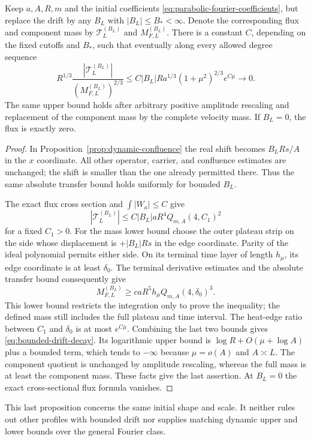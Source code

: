 \begin{proposition}
\label{prop:bounded-drift-shape}
Keep $a,A,R,m$ and the initial coefficients
\eqref{eq:parabolic-fourier-coefficients}, but replace the drift by any
$B_L$ with $|B_L|\le B_*<\infty$.  Denote the corresponding flux and
component mass by $\mathcal T_L^{(B_L)}$ and $M_{F,L}^{(B_L)}$.
There is a constant $C$, depending on the fixed cutoffs and $B_*$,
such that eventually along every allowed degree sequence
\begin{equation}\label{eq:bounded-drift-decay}
 R^{1/3}\frac{|\mathcal T_L^{(B_L)}|}
 {(M_{F,L}^{(B_L)})^{2/3}}
 \le C |B_L|R a^{1/3}(1+\mu^2)^{2/3}e^{C\mu}
 \longrightarrow0.
\end{equation}
The same upper bound holds after arbitrary positive amplitude
rescaling and replacement of the component mass by the complete
velocity mass.  If $B_L=0$, the flux is exactly zero.
\end{proposition}
\begin{proof}
In Proposition~\ref{prop:dynamic-confluence} the real shift becomes
$B_LRs/A$ in the $x$ coordinate.  All other operator, carrier, and
confluence estimates are unchanged; the shift is smaller than the one
already permitted there.  Thus the same absolute transfer bound holds
uniformly for bounded $B_L$.

The exact flux cross section and $\int|W_a|\le C$ give
\[
 |\mathcal T_L^{(B_L)}|
       \le C|B_L|aR^4 Q_{m,A}(4,C_1)^2
\]
for a fixed $C_1>0$.  For the mass lower bound choose the outer
plateau strip on the side whose displacement is $+|B_L|Rs$ in the
edge coordinate.  Parity of the ideal polynomial permits either side.
On its terminal time layer of length $h_\mu$, its edge coordinate is
at least $\delta_0$.  The terminal derivative estimates and the
absolute transfer bound consequently give
\[
 M_{F,L}^{(B_L)}
       \ge caR^5 h_\mu Q_{m,A}(4,\delta_0)^3.
\]
This lower bound restricts the integration only to prove the inequality;
the defined mass still includes the full plateau and time interval.
The heat-edge ratio between $C_1$ and $\delta_0$ is at most $e^{C\mu}$.
Combining the last two bounds gives
\eqref{eq:bounded-drift-decay}.  Its logarithmic upper bound is
$\log R+O(\mu+\log A)$ plus a bounded term, which tends to
$-\infty$ because $\mu=o(A)$ and $A\asymp L$.
The component quotient is unchanged by amplitude rescaling, whereas
the full mass is at least the component mass.  These facts give the
last assertion.  At $B_L=0$ the exact cross-sectional flux formula
vanishes.
\end{proof}

This last proposition concerns the same initial shape and scale.
It neither rules out other profiles with bounded drift nor supplies
matching dynamic upper and lower bounds over the general Fourier class.
